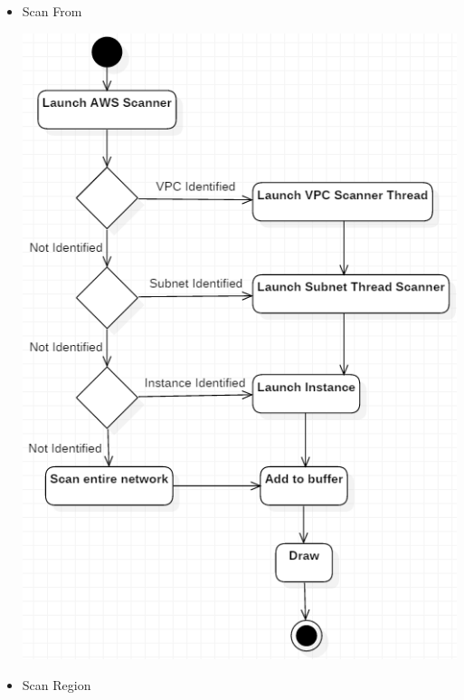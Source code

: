 \documentclass[a4paper,12pt]{report}
\begin{document}
\begin{itemize}
\begin{center}
		\end{center}
	\newpage
	\item Scan From
		\begin{center}
			 	\includegraphics[width=1\textwidth] {./Diagrams/ScanFromSequence.png}\\[0.4cm]
		\end{center}
	\item Scan Region
		\begin{center}

\end{center}
\end{itemize}
\end{document}
